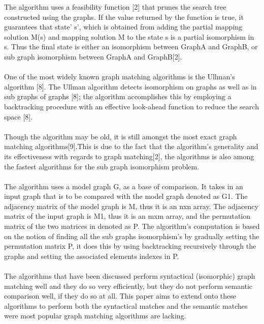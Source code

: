 The algorithm uses a feasibility function [2] that prunes the search tree constructed using the graphs. If the value returned by the function is true, it guarantees that state’ s', which is obtained from adding the partial mapping solution M(s) and mapping solution M to the state s is a partial isomorphism in s. Thus the final state is either an isomorphism between GraphA and GraphB, or sub graph isomorphism between GraphA and GraphB[2].\\\\
One of the most widely known graph matching algorithms is the Ullman's algorithm [8]. The Ullman algorithm detects isomorphism on graphs as well as in sub graphs of graphs [8]; the algorithm accomplishes this by employing a backtracking procedure with an effective look-ahead function to reduce the search space [8].\\\\
Though the algorithm may be old, it is still amongst the most exact graph matching algorithms[9].This is due to the fact that the algorithm's generality and its effectiveness with regards to graph matching[2], the algorithms is also among the fastest algorithms for the sub graph isomorphism problem.\\\\
The algorithm uses a model graph G, as a base of comparison. It takes in an input graph that is to be compared with the model graph denoted as G1. The adjacency matrix of the model graph is M, thus it is an nxn array. The adjacency matrix of the input graph is M1, thus it is an mxm array, and the permutation matrix of the two matrices in denoted as P. The algorithm's computation is based on the notion of finding all the sub graphs isomorphism’s by gradually setting the permutation matrix P, it does this by using backtracking recursively through the graphs and setting the associated elements indexes in P.\\\\
The algorithms that have been discussed perform syntactical (isomorphic) graph matching well and they do so very efficiently, but they do not perform semantic comparison well, if they do so at all. This paper aims to extend onto these algorithms to perform both the syntactical matches and the semantic matches were most popular graph matching algorithms are lacking.\\\\